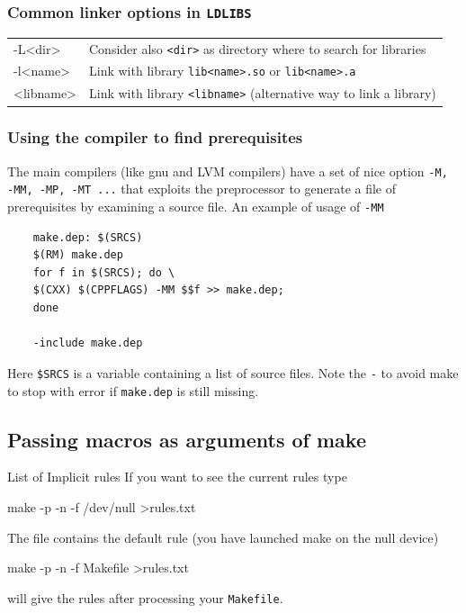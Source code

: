 \documentclass[10pt,aspectratio=169]{beamer}
\begin{document}
\begin{frame}
  \frametitle{Common linker  options in \texttt{LDLIBS}}
 \hspace*{-0.5cm}
  \begin{tabular}{>{\ttfamily}l|p{}}
    -L<dir> & Consider also \texttt{<dir>} as directory where to search for libraries\\
    -l<name>& Link with library \texttt{lib<name>.so} or \texttt{lib<name>.a}\\
    <libname> & Link with library \texttt{<libname>} (alternative way to link a library)
  \end{tabular}  
\end{frame}

\begin{frame}[fragile]
    \frametitle{Using the compiler to find prerequisites}
    The main compilers (like gnu and LVM compilers) have a set of nice
    option \texttt{-M, -MM, -MP, -MT ...} that exploits the preprocessor to generate a file of prerequisites by examining a source file. An example of usage of \texttt{-MM}
    \begin{verbatim}
    make.dep: $(SRCS)
    $(RM) make.dep
    for f in $(SRCS); do \
    $(CXX) $(CPPFLAGS) -MM $$f >> make.dep;
    done
    
    -include make.dep
    \end{verbatim}
    Here \texttt{\$SRCS} is a variable containing a list of source files.
    Note the \texttt{-} to avoid make to stop with error if \texttt{make.dep} is still missing.
\end{frame}

\subsection*{Passing macros as arguments of make}

\begin{frame}{List of Implicit rules}
  If you want to see the current rules type 
\begin{semiverbatim}
make -p -n -f /dev/null >rules.txt
\end{semiverbatim}
The file contains the default rule (you have launched make on the null device)
\begin{semiverbatim}
make -p -n -f Makefile >rules.txt
\end{semiverbatim}
will give the rules after processing your \texttt{Makefile}.
\end{frame}
\end{document}
